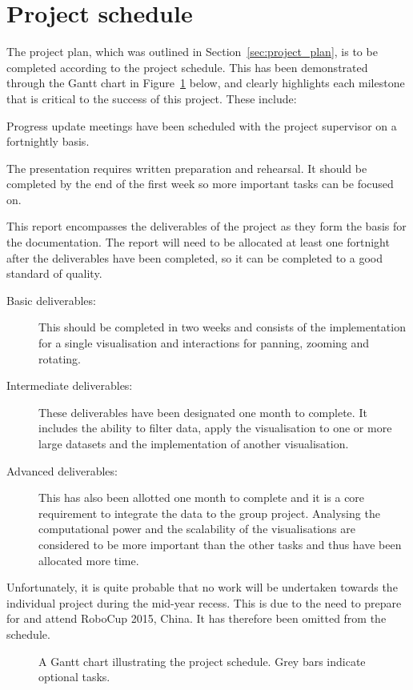 \documentclass[a4paper]{article}
\begin{document}
	\section{Project schedule} {
	\label{sec:project_schedule}
	
		The project plan, which was outlined in Section~\ref{sec:project_plan}, is to be completed according to the project schedule. This has been demonstrated through the Gantt chart in Figure~\ref{gantt:schedule} below, and clearly highlights each milestone that is critical to the success of this project. These include:
		
		\begin{description}[leftmargin=0pt]
			\item[Progress reports:] Progress update meetings have been scheduled with the project supervisor on a fortnightly basis.
			\item[Individual research presentation:] The presentation requires written preparation and rehearsal. It should be completed by the end of the first week so more important tasks can be focused on.
			\item[Final report:] This report encompasses the deliverables of the project as they form the basis for the documentation. The report will need to be allocated at least one fortnight after the deliverables have been completed, so it can be completed to a good standard of quality.
			\begin{description}
				\item[Basic deliverables:] This should be completed in two weeks and consists of the implementation for a single visualisation and interactions for panning, zooming and rotating.
				\item[Intermediate deliverables:] These deliverables have been designated one month to complete. It includes the ability to filter data, apply the visualisation to one or more large datasets and the implementation of another visualisation.
				\item[Advanced deliverables:] This has also been allotted one month to complete and it is a core requirement to integrate the data to the group project. Analysing the computational power and the scalability of the visualisations are considered to be more important than the other tasks and thus have been allocated more time.
			\end{description}
		\end{description}
		
		Unfortunately, it is quite probable that no work will be undertaken towards the individual project during the mid-year recess. This is due to the need to prepare for and attend RoboCup 2015, China. It has therefore been omitted from the schedule.
        
		\begin{figure}[H]
	        \resizebox{\textwidth}{!}{}
			\caption[Project schedule] {A Gantt chart illustrating the project schedule. Grey bars indicate optional tasks.}
			\label{gantt:schedule}
		\end{figure}
		
	}
	
\end{document}
